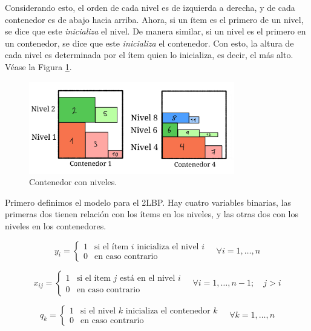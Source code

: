 \documentclass[letter, 10pt]{article}
\begin{document}
Considerando esto, el orden de cada nivel es de izquierda a derecha, y de cada contenedor es de abajo hacia arriba. Ahora, si un ítem es el primero de un nivel, se dice que este \textit{inicializa} el nivel. De manera similar, si un nivel es el primero en un contenedor, se dice que este \textit{inicializa} el contenedor. Con esto, la altura de cada nivel es determinada por el ítem quien lo inicializa, es decir, el más alto. Véase la Figura \ref{fig:conts}.

\begin{figure}[h]
    \centering
    \includegraphics[width=0.8\textwidth]{./img/conts.png}
    \caption{Contenedor con niveles.}
    \label{fig:conts}
\end{figure}

Primero definimos el modelo para el 2LBP. Hay cuatro variables binarias, las primeras dos tienen relación con los ítems en los niveles, y las otras dos con los niveles en los contenedores.

\begin{equation}
    y_i = \begin{cases}
        1 & \text{si el ítem $i$ inicializa el nivel $i$} \\
        0 & \text{en caso contrario}
    \end{cases} \quad \forall i = 1,\ldots,n
\end{equation}

\begin{equation}
    x_{ij} = \begin{cases}
        1 & \text{si el ítem $j$ está en el nivel $i$} \\
        0 & \text{en caso contrario}
    \end{cases} \quad \forall i = 1,\ldots,n-1; \quad j>i
\end{equation}

\begin{equation}
    q_k = \begin{cases}
        1 & \text{si el nivel $k$ inicializa el contenedor $k$} \\
        0 & \text{en caso contrario}
    \end{cases} \quad \forall k = 1,\ldots,n
\end{equation}
\end{document}
